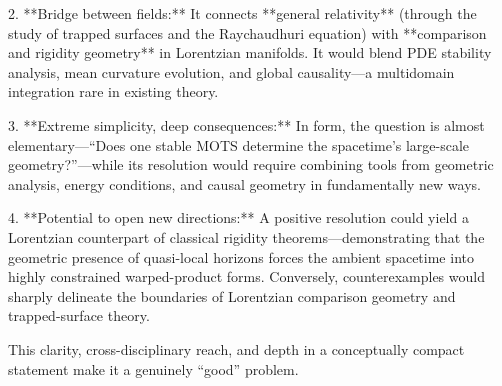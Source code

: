 2. **Bridge between fields:** It connects **general relativity** (through the study of trapped surfaces and the Raychaudhuri equation) with **comparison and rigidity geometry** in Lorentzian manifolds. It would blend PDE stability analysis, mean curvature evolution, and global causality—a multidomain integration rare in existing theory.  

3. **Extreme simplicity, deep consequences:** In form, the question is almost elementary—“Does one stable MOTS determine the spacetime’s large-scale geometry?”—while its resolution would require combining tools from geometric analysis, energy conditions, and causal geometry in fundamentally new ways.  

4. **Potential to open new directions:** A positive resolution could yield a Lorentzian counterpart of classical rigidity theorems—demonstrating that the geometric presence of quasi-local horizons forces the ambient spacetime into highly constrained warped-product forms. Conversely, counterexamples would sharply delineate the boundaries of Lorentzian comparison geometry and trapped-surface theory.  

This clarity, cross-disciplinary reach, and depth in a conceptually compact statement make it a genuinely “good” problem.